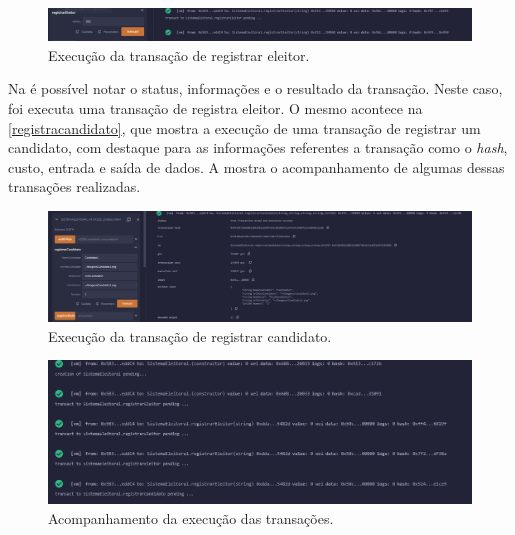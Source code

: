 \documentclass[portuguese]{textolivre}
\begin{document}
	
	
	\begin{figure}[htbp]
		\centering
		\begin{minipage}{1\textwidth}
			\includegraphics[width=\textwidth]{fig-006.png} %
			\caption{Execução da transação de registrar eleitor.}
			\label{dash-transa}
		\end{minipage}
	\end{figure}
	
	Na  é possível notar o status, informações e o resultado da transação. Neste caso, foi executa uma transação de registra eleitor. O mesmo acontece na \autoref{registracandidato}, que mostra a execução de uma transação de registrar um candidato, com destaque para as informações referentes a transação como o \textit{hash}, custo, entrada e saída de dados. A  mostra o acompanhamento de algumas dessas transações realizadas.
	
	
	\begin{figure}[htbp]
		\centering
		\begin{minipage}{1\textwidth}
			\includegraphics[width=\textwidth]{fig-007.png} %
			\caption{Execução da transação de registrar candidato.}
			\label{registracandidato}
		\end{minipage}
	\end{figure}
	
	\begin{figure}[htbp]
		\centering
		\begin{minipage}{1\textwidth}
			\includegraphics[width=\textwidth]{fig-008.png} %
			\caption{Acompanhamento da execução das transações.}
			\label{transacoes}
		\end{minipage}
	\end{figure}
	
\end{document}
